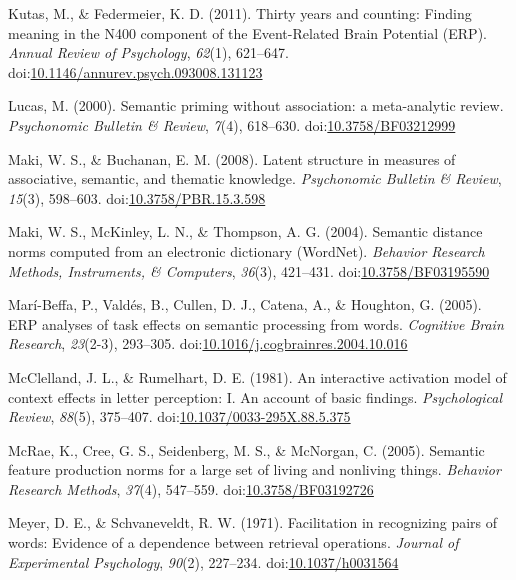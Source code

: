 \documentclass[english,man]{apa6}
\theoremstyle{definition}
\theoremstyle{definition}
\theoremstyle{definition}
\theoremstyle{remark}
\begin{document}
\hypertarget{ref-Kutas2011}{}
Kutas, M., \& Federmeier, K. D. (2011). Thirty years and counting:
Finding meaning in the N400 component of the Event-Related Brain
Potential (ERP). \emph{Annual Review of Psychology}, \emph{62}(1),
621--647.
doi:\href{https://doi.org/10.1146/annurev.psych.093008.131123}{10.1146/annurev.psych.093008.131123}

\hypertarget{ref-Lucas2000}{}
Lucas, M. (2000). Semantic priming without association: a meta-analytic
review. \emph{Psychonomic Bulletin \& Review}, \emph{7}(4), 618--630.
doi:\href{https://doi.org/10.3758/BF03212999}{10.3758/BF03212999}

\hypertarget{ref-Maki2008}{}
Maki, W. S., \& Buchanan, E. M. (2008). Latent structure in measures of
associative, semantic, and thematic knowledge. \emph{Psychonomic
Bulletin \& Review}, \emph{15}(3), 598--603.
doi:\href{https://doi.org/10.3758/PBR.15.3.598}{10.3758/PBR.15.3.598}

\hypertarget{ref-Maki2004}{}
Maki, W. S., McKinley, L. N., \& Thompson, A. G. (2004). Semantic
distance norms computed from an electronic dictionary (WordNet).
\emph{Behavior Research Methods, Instruments, \& Computers},
\emph{36}(3), 421--431.
doi:\href{https://doi.org/10.3758/BF03195590}{10.3758/BF03195590}

\hypertarget{ref-Mari-Beffa2005}{}
Marí-Beffa, P., Valdés, B., Cullen, D. J., Catena, A., \& Houghton, G.
(2005). ERP analyses of task effects on semantic processing from words.
\emph{Cognitive Brain Research}, \emph{23}(2-3), 293--305.
doi:\href{https://doi.org/10.1016/j.cogbrainres.2004.10.016}{10.1016/j.cogbrainres.2004.10.016}

\hypertarget{ref-McClelland1981}{}
McClelland, J. L., \& Rumelhart, D. E. (1981). An interactive activation
model of context effects in letter perception: I. An account of basic
findings. \emph{Psychological Review}, \emph{88}(5), 375--407.
doi:\href{https://doi.org/10.1037/0033-295X.88.5.375}{10.1037/0033-295X.88.5.375}

\hypertarget{ref-McRae2005}{}
McRae, K., Cree, G. S., Seidenberg, M. S., \& McNorgan, C. (2005).
Semantic feature production norms for a large set of living and
nonliving things. \emph{Behavior Research Methods}, \emph{37}(4),
547--559.
doi:\href{https://doi.org/10.3758/BF03192726}{10.3758/BF03192726}

\hypertarget{ref-Meyer1971}{}
Meyer, D. E., \& Schvaneveldt, R. W. (1971). Facilitation in recognizing
pairs of words: Evidence of a dependence between retrieval operations.
\emph{Journal of Experimental Psychology}, \emph{90}(2), 227--234.
doi:\href{https://doi.org/10.1037/h0031564}{10.1037/h0031564}
\end{document}
